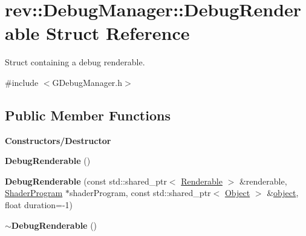 \hypertarget{structrev_1_1_debug_manager_1_1_debug_renderable}{}\section{rev\+::Debug\+Manager\+::Debug\+Renderable Struct Reference}
\label{structrev_1_1_debug_manager_1_1_debug_renderable}


Struct containing a debug renderable.  




{\ttfamily \#include $<$G\+Debug\+Manager.\+h$>$}

\subsection*{Public Member Functions}
\begin{Indent}\textbf{ Constructors/\+Destructor}\par
\begin{DoxyCompactItemize}
\item 
\mbox{\label{structrev_1_1_debug_manager_1_1_debug_renderable_a4c6c51ad22126c06c572998616d732ee}} 
{\bfseries Debug\+Renderable} ()
\item 
\mbox{\label{structrev_1_1_debug_manager_1_1_debug_renderable_a0efb8361a012f06fa1507bf855ad3f9f}} 
{\bfseries Debug\+Renderable} (const std\+::shared\+\_\+ptr$<$ \mbox{\hyperlink{classrev_1_1_renderable}{Renderable}} $>$ \&renderable, \mbox{\hyperlink{classrev_1_1_shader_program}{Shader\+Program}} $\ast$shader\+Program, const std\+::shared\+\_\+ptr$<$ \mbox{\hyperlink{classrev_1_1_object}{Object}} $>$ \&\mbox{\hyperlink{structrev_1_1_debug_manager_1_1_debug_renderable_a4283f2324810d7683b4b615b54430fd1}{object}}, float duration=-\/1)
\item 
\mbox{\label{structrev_1_1_debug_manager_1_1_debug_renderable_a682f77c7ae081b245abcc892348954a5}} 
{\bfseries $\sim$\+Debug\+Renderable} ()
\end{DoxyCompactItemize}
\end{Indent}
